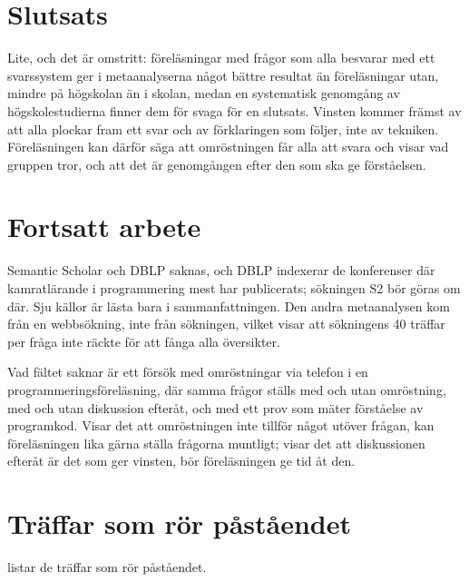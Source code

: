 \section{Slutsats}
\label{sec:recap-polls-slutsats}

Lite, och det är omstritt: föreläsningar med frågor som alla besvarar
med ett svarssystem ger i metaanalyserna något bättre resultat än
föreläsningar utan, mindre på högskolan än i skolan, medan en
systematisk genomgång av högskolestudierna finner dem för svaga för en
slutsats.  Vinsten kommer främst av
att alla plockar fram ett svar och av förklaringen som följer, inte av
tekniken.  Föreläsningen kan därför säga att omröstningen får alla att
svara och visar vad gruppen tror, och att det är genomgången efter den
som ska ge förståelsen.

\section{Fortsatt arbete}
\label{sec:recap-polls-fortsatt}

Semantic Scholar och DBLP saknas, och DBLP indexerar de konferenser där
kamratlärande i programmering mest har publicerats; sökningen S2 bör
göras om där.  Sju källor är lästa bara i sammanfattningen.  Den andra
metaanalysen kom från en webbsökning, inte från sökningen, vilket
visar att sökningens 40 träffar per fråga inte räckte för att fånga alla
översikter.

Vad fältet saknar är ett försök med omröstningar via telefon i en
programmeringsföreläsning, där samma frågor ställs med och utan
omröstning, med och utan diskussion efteråt, och med ett prov som mäter
förståelse av programkod.  Visar det att omröstningen inte tillför något
utöver frågan, kan föreläsningen lika gärna ställa frågorna muntligt;
visar det att diskussionen efteråt är det som ger vinsten, bör
föreläsningen ge tid åt den.

\section{Träffar som rör påståendet}

 listar de träffar som rör påståendet.


